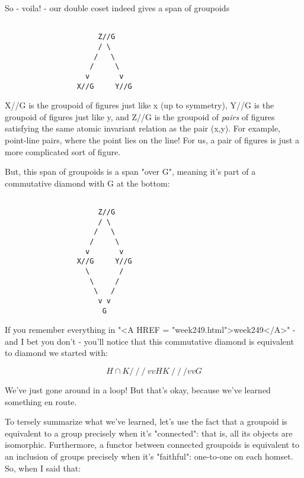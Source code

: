 So - voila! - our double coset indeed gives a span of groupoids


\begin{verbatim}

                      Z//G
                      / \
                     /   \
                    /     \
                   v       v
                 X//G     Y//G
\end{verbatim}
    

X//G is the groupoid of figures just like x (up to symmetry), Y//G
is the groupoid of figures just like y, and Z//G is the groupoid of 
\emph{pairs} of figures satisfying the same atomic invariant relation
as the pair (x,y).  For example, point-line pairs, where the point
lies on the line!  For us, a pair of figures is just a more complicated
sort of figure.

But, this span of groupoids is a span "over G", meaning it's
part of a commutative diamond with G at the bottom:


\begin{verbatim}

                      Z//G
                      / \
                     /   \
                    /     \
                   v       v
                 X//G     Y//G
                   \       /
                    \     /
                     \   /
                      v v
                       G
\end{verbatim}
    

If you remember everything in "<A HREF =
"week249.html">week249</A>" - and I bet you don't - you'll notice
that this commutative diamond is equivalent to diamond we started
with:


$$

                      H\cap K
                      / \
                     /   \
                    /     \
                   v       v
                  H         K
                   \       /
                    \     /
                     \   /
                      v v
                       G
$$
    
We've just gone around in a loop!  But that's okay, because we've
learned something en route.

To tersely summarize what we've learned, let's use the fact that a 
groupoid is equivalent to a group precisely when it's "connected":
that is, all its objects are isomorphic.  Furthermore, a functor between 
connected groupoids is equivalent to an inclusion of groups precisely 
when it's "faithful": one-to-one on each homset.  So, when I said that:

